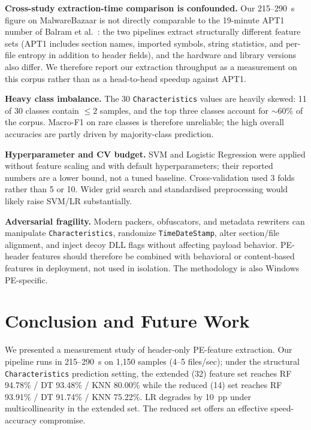 \documentclass[conference,a4paper]{IEEEtran}
\begin{document}
\textbf{Cross-study extraction-time comparison is confounded.} Our 215--290~s figure on MalwareBazaar is not directly comparable to the 19-minute APT1 number of Balram et al.\ \cite{balram2019static}: the two pipelines extract structurally different feature sets (APT1 includes section names, imported symbols, string statistics, and per-file entropy in addition to header fields), and the hardware and library versions also differ. We therefore report our extraction throughput as a measurement on this corpus rather than as a head-to-head speedup against APT1.

\textbf{Heavy class imbalance.} The 30 \texttt{Characteristics} values are heavily skewed: 11 of 30 classes contain $\le 2$ samples, and the top three classes account for $\sim$60\% of the corpus. Macro-F1 on rare classes is therefore unreliable; the high overall accuracies are partly driven by majority-class prediction.

\textbf{Hyperparameter and CV budget.} SVM and Logistic Regression were applied without feature scaling and with default hyperparameters; their reported numbers are a lower bound, not a tuned baseline. Cross-validation used 3 folds rather than 5 or 10. Wider grid search and standardised preprocessing would likely raise SVM/LR substantially.

\textbf{Adversarial fragility.} Modern packers, obfuscators, and metadata rewriters can manipulate \texttt{Characteristics}, randomize \texttt{TimeDateStamp}, alter section/file alignment, and inject decoy DLL flags without affecting payload behavior. PE-header features should therefore be combined with behavioral or content-based features in deployment, not used in isolation. The methodology is also Windows PE-specific.

\section{Conclusion and Future Work}

We presented a measurement study of header-only PE-feature extraction. Our pipeline runs in 215--290~s on 1{,}150 samples (4--5 files/sec); under the structural \texttt{Characteristics} prediction setting, the extended (32) feature set reaches RF 94.78\% / DT 93.48\% / KNN 80.00\% while the reduced (14) set reaches RF 93.91\% / DT 91.74\% / KNN 75.22\%. LR degrades by 10~pp under multicollinearity in the extended set. The reduced set offers an effective speed-accuracy compromise.
\end{document}
